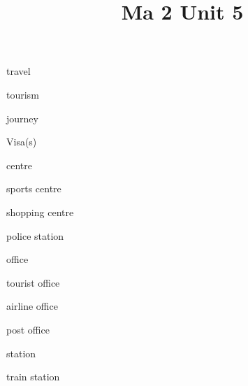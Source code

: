 \documentclass[avery5371,grid,frame]{flashcards}
\title{Ma 2 Unit 5}
\begin{document}
\begin{flashcard}{\LARGE travel}
\LARGE {}
\end{flashcard}
\begin{flashcard}{\LARGE tourism}
\LARGE {}
\end{flashcard}
\begin{flashcard}{\LARGE journey}
\LARGE {}
\end{flashcard}
\begin{flashcard}{\LARGE Visa(s)}
\LARGE {}
\end{flashcard}
\begin{flashcard}{\LARGE centre}
\LARGE {}
\end{flashcard}
\begin{flashcard}{\LARGE sports centre}
\LARGE {}
\end{flashcard}
\begin{flashcard}{\LARGE shopping centre}
\LARGE {}
\end{flashcard}
\begin{flashcard}{\LARGE police station}
\LARGE {}
\end{flashcard}
\begin{flashcard}{\LARGE office}
\LARGE {}
\end{flashcard}
\begin{flashcard}{\LARGE tourist office}
\LARGE {}
\end{flashcard}
\begin{flashcard}{\LARGE airline office}
\LARGE {}
\end{flashcard}
\begin{flashcard}{\LARGE post office}
\LARGE {}
\end{flashcard}
\begin{flashcard}{\LARGE station}
\LARGE {}
\end{flashcard}
\begin{flashcard}{\LARGE train station}
\LARGE {}
\end{flashcard}
\end{document}
